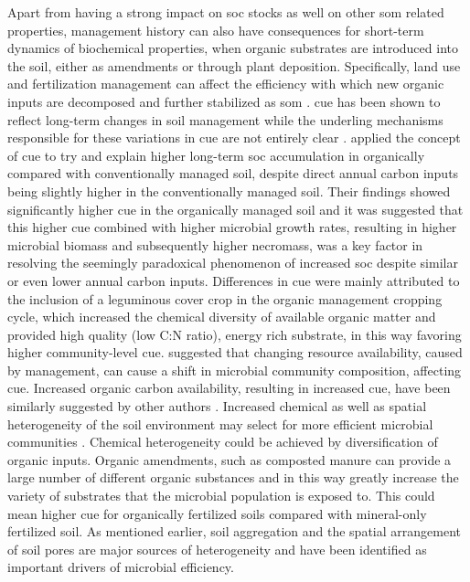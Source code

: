		Apart from having a strong impact on \gls{soc} stocks as well on other \gls{som} related properties, management history can also have consequences for short-term dynamics of biochemical properties, when organic substrates are introduced into the soil, either as amendments or through plant deposition. Specifically, land use and fertilization management can affect the efficiency with which new organic inputs are decomposed and further stabilized as \gls{som} \citep{lee2014}. \gls{cue} has been shown to reflect long-term changes in soil management  while the underling mechanisms responsible for these variations in \gls{cue} are not entirely clear \citep{kallenbach2019}.
		\citet{kallenbach2015} applied the concept of \gls{cue} to try and explain higher long-term \gls{soc} accumulation in organically compared with conventionally managed soil, despite direct annual carbon inputs being slightly higher in the conventionally managed soil. Their findings showed significantly higher \gls{cue} in the organically managed soil and it was suggested that this higher \gls{cue} combined with higher microbial growth rates, resulting in higher microbial biomass and subsequently higher necromass, was a key factor in resolving the seemingly paradoxical phenomenon of increased \gls{soc} despite similar or even lower annual carbon inputs. Differences in \gls{cue} were mainly attributed to the inclusion of a leguminous cover crop in the organic management cropping cycle, which increased the chemical diversity of available organic matter and provided high quality (low C:N ratio), energy rich substrate, in this way favoring higher community-level \gls{cue}.
		\citet{roller2015} suggested that changing resource availability, caused by management, can cause a shift in microbial community composition, affecting \gls{cue}. Increased organic carbon availability, resulting in increased \gls{cue}, have been similarly suggested by other authors \citep{cotrufo2013}.
		Increased chemical as well as spatial heterogeneity of the soil environment may select for more efficient microbial communities \citep{pfeiffer2001, nunan2017}. Chemical heterogeneity could be achieved by diversification of organic inputs. Organic amendments, such as composted manure can provide a large number of different organic substances \citep{zbytniewski2005} and in this way greatly increase the  variety of substrates that the microbial population is exposed to. This could mean higher \gls{cue} for organically fertilized soils compared with mineral-only fertilized soil.
		As mentioned earlier, soil aggregation and the spatial arrangement of soil pores are major sources of heterogeneity and have been identified as important drivers of microbial efficiency\citep{kravchenko2019}.
